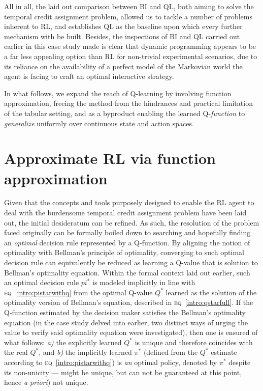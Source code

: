 All in all, the laid out comparison between BI and QL, both aiming to solve the temporal credit assignment problem,
allowed us to tackle a number of problems inherent to RL, and
establishes QL as the baseline upon which every further mechanism with be built.
Besides, the inspections of BI and QL carried out earlier in this case study made is clear that
dynamic programming appears to be a far less appealing option than RL for non-trivial experimental scenarios,
due to its reliance on the availability of a perfect model of the Markovian world the agent is facing
to craft an optimal interactive strategy.

In what follows, we expand the reach of Q-learning by involving function approximation,
freeing the method from the hindrances and practical limitation of the tabular setting,
and as a byproduct enabling the learned Q-\emph{function} to \emph{generalize} uniformly over continuous
state and action spaces.

\section{Approximate RL via function approximation}

Given that the concepts and tools purposely designed to enable the RL agent to deal with the burdensome
temporal credit assignment problem have been laid out, the initial desideratum can be refined.
As such, the resolution of the problem faced originally can be formally boiled down to
searching and hopefully finding an \emph{optimal} decision rule represented by a Q-function.
By aligning the notion of optimality with Bellman's principle of optimality, converging to such optimal
decision rule can equivalently be reduced as learning a Q-value that is solution to Bellman's optimality equation.
Within the formal context laid out earlier, such an optimal decision rule $pi^*$ is modeled
implicitly in line with \textsc{eq}~\ref{intro:pistarwithq} from the optimal Q-value $Q^*$ learned as the solution
of the optimality version of Bellman's equation, described in \textsc{eq}~\ref{intro:qstarfull}.
If the Q-function estimated by the decision maker satisfies the Bellman's optimality equation
(in the case study delved into earlier, two distinct ways of urging the value to verify said optimality
equation were investigated), then one is ensured of what follows:
\textit{a)} the explicitly learned $Q^*$ is unique and therefore coincides with the real $Q^*$, and
\textit{b)} the implicitly learned $\pi^*$
(defined from the $Q^*$ estimate according to \textsc{eq}~\ref{intro:pistarwithq})
is \emph{an} optimal policy, denoted by $\pi^*$ despite its non-unicity
--- might be unique, but can not be guaranteed at this point, hence \textit{a priori}) not unique.


